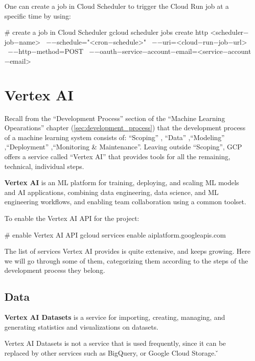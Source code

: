 One can create a job in Cloud Scheduler to trigger the Cloud Run job at a specific time by using:
\begin{bash}
# create a job in Cloud Scheduler
gcloud scheduler jobs create http <scheduler$-$job$-$name> \
    $-$$-$schedule="<cron$-$schedule>" \
    $-$$-$uri=<cloud$-$run$-$job$-$url> \
    $-$$-$http$-$method=POST \
    $-$$-$oauth$-$service$-$account$-$email=<service$-$account$-$email>
\end{bash}

\section{Vertex AI}

Recall from the ``Development Process'' section of the ``Machine Learning Opearations'' chapter
(\ref{sec:development_process}) that the development process of a machine learning system consists of: ``Scoping'' ,
``Data'' ,``Modeling'' ,``Deployment'' ,``Monitoring \& Maintenance''. Leaving outside ``Scoping'', GCP offers a
service called ``Vertex AI'' that provides tools for all the remaining, technical, individual steps.

\bd[Vertex AI]
\textbf{Vertex AI} is an ML platform for training, deploying, and scaling ML models and AI applications, combining data
engineering, data science, and ML engineering workflows, and enabling team collaboration using a common toolset.
\ed

To enable the Vertex AI API for the project:
\begin{bash}
# enable Vertex AI API
gcloud services enable aiplatform.googleapis.com
\end{bash}

The list of services Vertex AI provides is quite extensive, and keeps growing. Here we will go through some of them,
categorizing them according to the steps of the development process they belong.

\subsection{Data}

\textbf{Vertex AI Datasets} is a service for importing, creating, managing, and generating statistics and visualizations
on datasets.
\ed

Vertex AI Datasets is not a service that is used frequently, since it can be replaced by other services such as
BigQuery, or Google Cloud Storage. \v

